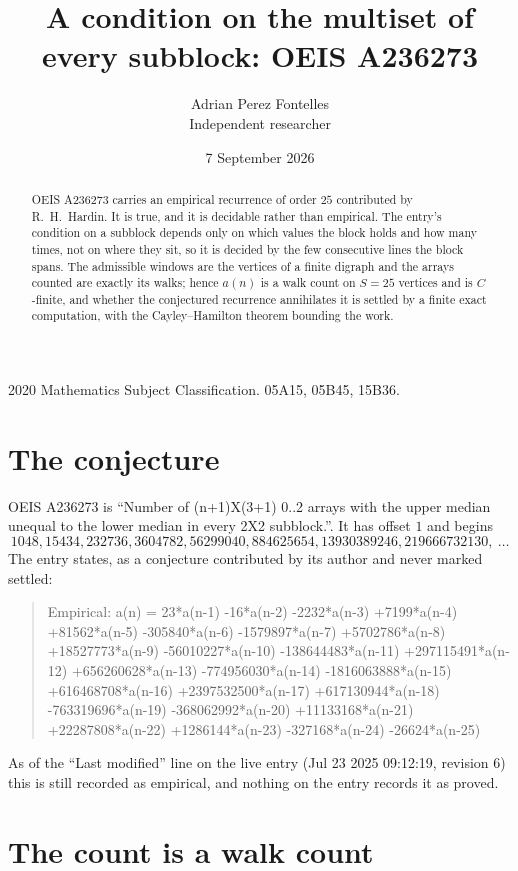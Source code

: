 \documentclass[11pt,a4paper]{article}
\title{A condition on the multiset of every subblock: OEIS A236273}
\author{Adrian Perez Fontelles\\ \small Independent researcher}
\date{7 September 2026}
\theoremstyle{plain}
\theoremstyle{definition}
\begin{document}
\maketitle

\begin{abstract}
OEIS A236273 carries an empirical recurrence of order $25$ contributed by R.~H.~Hardin. It is
true, and it is decidable rather than empirical. The entry's condition on a subblock depends
only on which values the block holds and how many times, not on where they sit, so it is
decided by the few consecutive lines the block spans. The admissible windows are the vertices
of a finite digraph and the arrays counted are exactly its walks; hence $a(n)$ is a walk count
on $S=25$ vertices and is $C$-finite, and whether the conjectured recurrence annihilates it
is settled by a finite exact computation, with the Cayley--Hamilton theorem bounding the
work.
\end{abstract}

\noindent\small 2020 Mathematics Subject Classification. 05A15, 05B45, 15B36.\normalsize

\section{The conjecture}

OEIS A236273 is ``Number of (n+1)X(3+1) 0..2 arrays with the upper median unequal to the lower median in every 2X2 subblock.''. It has offset $1$ and begins
\[
1048, 15434, 232736, 3604782, 56299040, 884625654, 13930389246, 219666732130,\ \dots
\]
The entry states, as a conjecture contributed by its author and never marked settled:
\begin{quote}
Empirical: a(n) = 23*a(n-1) -16*a(n-2) -2232*a(n-3) +7199*a(n-4) +81562*a(n-5) -305840*a(n-6) -1579897*a(n-7) +5702786*a(n-8) +18527773*a(n-9) -56010227*a(n-10) -138644483*a(n-11) +297115491*a(n-12) +656260628*a(n-13) -774956030*a(n-14) -1816063888*a(n-15) +616468708*a(n-16) +2397532500*a(n-17) +617130944*a(n-18) -763319696*a(n-19) -368062992*a(n-20) +11133168*a(n-21) +22287808*a(n-22) +1286144*a(n-23) -327168*a(n-24) -26624*a(n-25)
\end{quote}
As of the ``Last modified'' line on the live entry (Jul 23 2025 09:12:19, revision 6) this is still
recorded as empirical, and nothing on the entry records it as proved.

\section{The count is a walk count}
\end{document}
